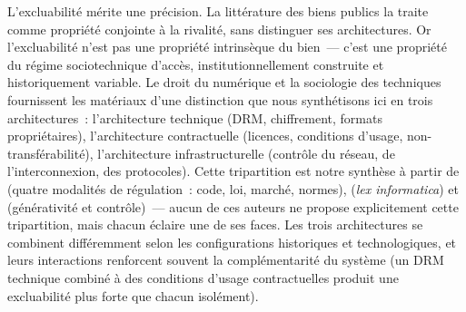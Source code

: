 L'excluabilité mérite une précision. La littérature des biens publics la traite comme propriété conjointe à la rivalité, sans distinguer ses architectures. Or l'excluabilité n'est pas une propriété intrinsèque du bien~--- c'est une propriété du régime sociotechnique d'accès, institutionnellement construite et historiquement variable. Le droit du numérique et la sociologie des techniques fournissent les matériaux d'une distinction que nous synthétisons ici en trois architectures~: l'architecture technique (DRM, chiffrement, formats propriétaires), l'architecture contractuelle (licences, conditions d'usage, non-transférabilité), l'architecture infrastructurelle (contrôle du réseau, de l'interconnexion, des protocoles). Cette tripartition est notre synthèse à partir de \textcite{lessig_code_1999} (quatre modalités de régulation~: code, loi, marché, normes), \textcite{reidenberg_lex_1998} (\emph{lex informatica}) et \textcite{zittrain_future_2008} (générativité et contrôle)~--- aucun de ces auteurs ne propose explicitement cette tripartition, mais chacun éclaire une de ses faces. Les trois architectures se combinent différemment selon les configurations historiques et technologiques, et leurs interactions renforcent souvent la complémentarité du système (un DRM technique combiné à des conditions d'usage contractuelles produit une excluabilité plus forte que chacun isolément).


